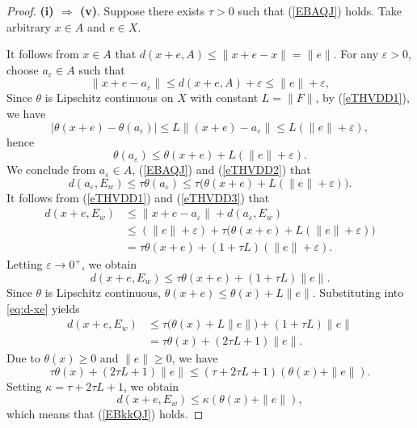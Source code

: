 \documentclass[10pt,a4paper]{amsart}
\begin{document}
\begin{proof}
	\noindent\textbf{(i) $\Rightarrow$ (v)}.
Suppose there exists \(\tau > 0\)  such that   (\ref{EBAQJ}) holds. Take arbitrary \(x \in A\) and \(e \in X\).

It follows from  \(x \in A\)  that \(d(x+e, A) \le \|x+e - x\| = \|e\|\).
  For any \(\varepsilon > 0\), choose \(a_\varepsilon \in A\) such that
\begin{equation}\label{eTHVDD1}
\|x+e - a_\varepsilon\| \le d(x+e, A) + \varepsilon \le \|e\| + \varepsilon,
\end{equation}
Since  \(\theta\) is Lipschitz continuous on \(X\) with constant \(L = \|F\|\),  by (\ref{eTHVDD1}), we have 
\[
|\theta(x+e) - \theta(a_\varepsilon)| \le L \|(x+e) - a_\varepsilon\| \le L(\|e\| + \varepsilon),
\]
hence
\begin{equation}\label{eTHVDD2}
	\theta(a_\varepsilon) \le \theta(x+e) + L(\|e\| + \varepsilon).
\end{equation}
 We conclude from  \(a_\varepsilon \in A\),  (\ref{EBAQJ})  and  (\ref{eTHVDD2})  that
\begin{equation}\label{eTHVDD3}
	d(a_\varepsilon, E_w) \le \tau \theta(a_\varepsilon) \le \tau\bigl(\theta(x+e) + L(\|e\| + \varepsilon)\bigr).
\end{equation}
  It follows from  (\ref{eTHVDD1})  and  (\ref{eTHVDD3})    that
\[
\begin{aligned}
	d(x+e, E_w) &\le \|x+e - a_\varepsilon\| + d(a_\varepsilon, E_w) \\
	&\le (\|e\| + \varepsilon) + \tau\bigl(\theta(x+e) + L(\|e\| + \varepsilon)\bigr) \\
	&= \tau \theta(x+e) + (1 + \tau L)(\|e\| + \varepsilon).
\end{aligned}
\]
Letting \(\varepsilon \to 0^+\), we obtain
\begin{equation}\label{eq:d-xe}
	d(x+e, E_w) \le \tau \theta(x+e) + (1 + \tau L)\|e\|.
\end{equation}
Since  \(\theta\) is Lipschitz continuous, \(\theta(x+e) \le \theta(x) + L\|e\|\). Substituting into \eqref{eq:d-xe} yields
\[
\begin{aligned}
	d(x+e, E_w) &\le \tau\bigl(\theta(x) + L\|e\|\bigr) + (1 + \tau L)\|e\| \\
	&= \tau \theta(x) + (2\tau L + 1)\|e\|.
\end{aligned}
\]
 Due to  \(\theta(x) \ge 0\) and \(\|e\| \ge 0\), we have
\[
\tau \theta(x) + (2\tau L + 1)\|e\| \le (\tau + 2\tau L + 1)(\theta(x) + \|e\|).
\]
Setting \(\kappa = \tau + 2\tau L + 1\), we obtain
\[
d(x+e, E_w) \le \kappa (\theta(x) + \|e\|),
\]
  which means that  (\ref{EBkkQJ}) holds.


\end{proof}
\end{document}
